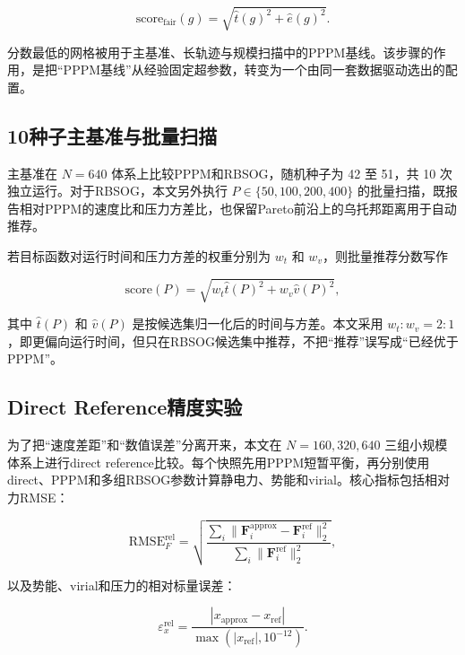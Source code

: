 \begin{equation}
\mathrm{score}_{\mathrm{fair}}(g)=\sqrt{\hat t(g)^2+\hat e(g)^2}.
\label{eq:method_fairness}
\end{equation}

分数最低的网格被用于主基准、长轨迹与规模扫描中的PPPM基线。该步骤的作用，是把“PPPM基线”从经验固定超参数，转变为一个由同一套数据驱动选出的配置。

\subsection{10种子主基准与批量扫描}

主基准在 $N=640$ 体系上比较PPPM和RBSOG，随机种子为 42 至 51，共 10 次独立运行。对于RBSOG，本文另外执行 $P\in\{50,100,200,400\}$ 的批量扫描，既报告相对PPPM的速度比和压力方差比，也保留Pareto前沿上的乌托邦距离用于自动推荐。

若目标函数对运行时间和压力方差的权重分别为 $w_t$ 和 $w_v$，则批量推荐分数写作

\begin{equation}
\mathrm{score}(P)=\sqrt{w_t\hat t(P)^2+w_v\hat v(P)^2},
\label{eq:method_pareto}
\end{equation}

其中 $\hat t(P)$ 和 $\hat v(P)$ 是按候选集归一化后的时间与方差。本文采用 $w_t:w_v=2:1$，即更偏向运行时间，但只在RBSOG候选集中推荐，不把“推荐”误写成“已经优于PPPM”。

\subsection{Direct Reference精度实验}

为了把“速度差距”和“数值误差”分离开来，本文在 $N=160,320,640$ 三组小规模体系上进行direct reference比较。每个快照先用PPPM短暂平衡，再分别使用direct、PPPM和多组RBSOG参数计算静电力、势能和virial。核心指标包括相对力RMSE：

\begin{equation}
\mathrm{RMSE}^{\mathrm{rel}}_F = \sqrt{\frac{\sum_i \|\mathbf{F}^{\mathrm{approx}}_i-\mathbf{F}^{\mathrm{ref}}_i\|_2^2}{\sum_i \|\mathbf{F}^{\mathrm{ref}}_i\|_2^2}},
\label{eq:method_force_rmse}
\end{equation}

以及势能、virial和压力的相对标量误差：

\begin{equation}
\varepsilon_x^{\mathrm{rel}} = \frac{|x_{\mathrm{approx}}-x_{\mathrm{ref}}|}{\max(|x_{\mathrm{ref}}|,10^{-12})}.
\label{eq:method_scalar_error}
\end{equation}

